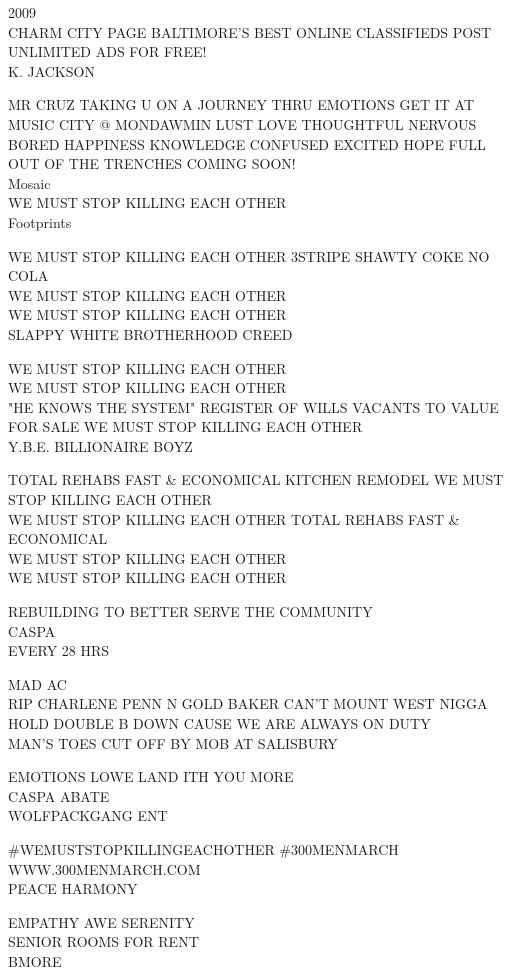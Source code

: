 \documentclass[10pt,letterpaper]{article}
\begin{document}
2009\\
CHARM CITY PAGE BALTIMORE'S BEST ONLINE CLASSIFIEDS POST UNLIMITED ADS FOR FREE!\\
K. JACKSON

MR CRUZ TAKING U ON A JOURNEY THRU EMOTIONS GET IT AT MUSIC CITY @ MONDAWMIN LUST LOVE THOUGHTFUL NERVOUS BORED HAPPINESS KNOWLEDGE CONFUSED EXCITED HOPE FULL OUT OF THE TRENCHES COMING SOON!\\
Mosaic\\
WE MUST STOP KILLING EACH OTHER\\
Footprints

WE MUST STOP KILLING EACH OTHER 3STRIPE SHAWTY COKE NO COLA\\
WE MUST STOP KILLING EACH OTHER\\
WE MUST STOP KILLING EACH OTHER\\
SLAPPY WHITE BROTHERHOOD CREED

WE MUST STOP KILLING EACH OTHER\\
WE MUST STOP KILLING EACH OTHER\\
"HE KNOWS THE SYSTEM" REGISTER OF WILLS VACANTS TO VALUE FOR SALE WE MUST STOP KILLING EACH OTHER\\
Y.B.E. BILLIONAIRE BOYZ

TOTAL REHABS FAST \& ECONOMICAL KITCHEN REMODEL WE MUST STOP KILLING EACH OTHER\\
WE MUST STOP KILLING EACH OTHER TOTAL REHABS FAST \& ECONOMICAL\\
WE MUST STOP KILLING EACH OTHER\\
WE MUST STOP KILLING EACH OTHER

REBUILDING TO BETTER SERVE THE COMMUNITY\\
CASPA\\
EVERY 28 HRS

MAD AC\\
RIP CHARLENE PENN N GOLD BAKER CAN'T MOUNT WEST NIGGA HOLD DOUBLE B DOWN CAUSE WE ARE ALWAYS ON DUTY\\
MAN'S TOES CUT OFF BY MOB AT SALISBURY

EMOTIONS LOWE LAND ITH YOU MORE\\
CASPA ABATE\\
WOLFPACKGANG ENT

\#WEMUSTSTOPKILLINGEACHOTHER \#300MENMARCH WWW.300MENMARCH.COM\\
PEACE HARMONY

EMPATHY AWE SERENITY\\
SENIOR ROOMS FOR RENT\\
BMORE
\end{document}
